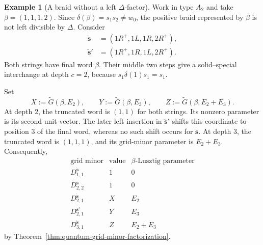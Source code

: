 \documentclass[12pt, reqno]{amsart}
\theoremstyle{plain}
\theoremstyle{definition}
\newtheorem{example}[theorem]{Example}
\numberwithin{equation}{section}
\begin{document}
\begin{example}[A braid without a left \(\Delta\)-factor]
\label{ex:T-system-without-Delta-factor}
Work in type \(A_2\) and take \(\beta=(1,1,1,2)\). Since
\(\delta(\beta)=s_1s_2\neq w_0\), the positive braid represented
by \(\beta\) is not left divisible by \(\Delta\). Consider
\[
\begin{aligned}
 \ddot{\mathbf s}
   &=(1R^+,1L,1R,2R^+),\\
 \ddot{\mathbf s}'
   &=(1R^+,1R,1L,2R^+).
\end{aligned}
\]
Both strings have final word \(\beta\). Their middle two steps
give a solid--special interchange at depth \(c=2\), because
\(s_1\delta(1)s_1=s_1\).

Set
\[
 X:=\widetilde G(\beta,E_2),\qquad
 Y:=\widetilde G(\beta,E_3),\qquad
 Z:=\widetilde G(\beta,E_2+E_3).
\]
At depth \(2\), the truncated word is \((1,1)\) for both
strings. Its nonzero parameter is its second unit vector. The
later left insertion in \(\ddot{\mathbf s}'\) shifts this
coordinate to position \(3\) of the final word, whereas no such
shift occurs for \(\ddot{\mathbf s}\). At depth \(3\), the
truncated word is \((1,1,1)\), and its grid-minor parameter is
\(E_2+E_3\). Consequently,
\[
\begin{array}{c|c|c}
 \text{grid minor}&\text{value}&\beta\text{-Lusztig parameter}\\ \hline
 D_{1,1}^{\ddot{\mathbf s}}&1&0\\
 D_{2,2}^{\ddot{\mathbf s}}&1&0\\
 D_{2,1}^{\ddot{\mathbf s}}&X&E_2\\
 D_{2,1}^{\ddot{\mathbf s}'}&Y&E_3\\
 D_{3,1}^{\ddot{\mathbf s}}&Z&E_2+E_3
\end{array}
\]
by Theorem~\ref{thm:quantum-grid-minor-factorization}.


\end{example}
\end{document}
